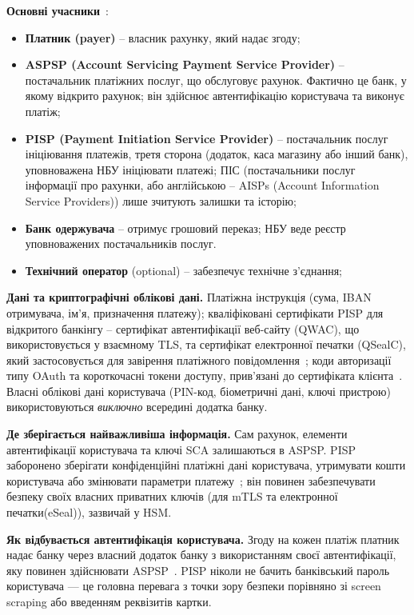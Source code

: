 \textbf{Основні учасники}~\cite[п.~3, 6--8]{nbu80}:
\begin{itemize}[noitemsep]
    \item \textbf{Платник (payer)} -- власник рахунку, який надає згоду;
    \item \textbf{ASPSP (Account Servicing Payment Service Provider)} -- постачальник платіжних послуг, що обслуговує 
        рахунок. Фактично це банк, у якому відкрито рахунок; він здійснює автентифікацію користувача та виконує платіж;
    \item \textbf{PISP (Payment Initiation Service Provider)} -- постачальник послуг ініціювання платежів, третя 
        сторона (додаток, каса магазину або інший банк), уповноважена НБУ ініціювати платежі; ПІС (постачальники 
        послуг інформації про рахунки, або англійською -- AISPs (Account Information Service
        Providers)) лише зчитують залишки та історію;
    \item \textbf{Банк одержувача} -- отримує грошовий переказ; НБУ веде реєстр уповноважених постачальників 
        послуг.
    \item \textbf{Технічний оператор} (optional) -- забезпечує технічне з'єднання;
\end{itemize}

\textbf{Дані та криптографічні облікові дані.} Платіжна інструкція (сума, IBAN отримувача, ім'я, призначення 
платежу); кваліфіковані сертифікати PISP для відкритого банкінгу -- сертифікат автентифікації веб-сайту (QWAC), 
що використовується у взаємному TLS, та сертифікат електронної печатки (QSealC), який застосовується для завірення 
платіжного повідомлення~\cite[п.~16, 30--31, 34]{nbu80}; коди авторизації типу OAuth та короткочасні токени доступу, 
прив'язані до сертифіката клієнта~\cite{fapi2, rfc8705}. Власні облікові дані користувача (PIN-код, біометричні 
дані, ключі пристрою) використовуються \emph{виключно} всередині додатка банку.

\textbf{Де зберігається найважливіша інформація.} Сам рахунок, елементи автентифікації користувача та ключі SCA 
залишаються в ASPSP. PISP заборонено зберігати конфіденційні платіжні дані користувача, утримувати кошти користувача 
або змінювати параметри платежу~\cite[п.~35]{nbu80}; він повинен забезпечувати безпеку своїх
власних приватних ключів (для mTLS та електронної печатки(eSeal)), зазвичай у HSM.

\textbf{Як відбувається автентифікація користувача.} Згоду на кожен платіж платник надає банку через власний 
додаток банку з використанням своєї автентифікації, яку повинен здійснювати ASPSP~\cite[п.~47--48]{nbu80}. PISP 
ніколи не бачить банківський пароль користувача — це головна перевага з точки зору безпеки порівняно зі screen scraping 
або введенням реквізитів картки.

